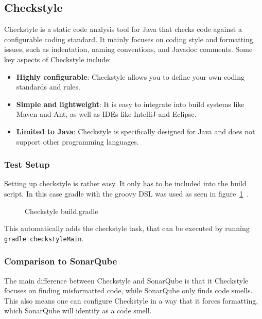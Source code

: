 \subsection{Checkstyle}\label{subsec:checkstyle}
Checkstyle is a static code analysis tool for Java that checks code against a configurable coding standard.
It mainly focuses on coding style and formatting issues, such as indentation, naming conventions, and Javadoc comments.\cite{checkstyle-docs}
Some key aspects of Checkstyle include:

\begin{itemize}
    \item\textbf{Highly configurable}: Checkstyle allows you to define your own coding standards and rules.
    \item\textbf{Simple and lightweight}: It is easy to integrate into build systems like Maven and Ant, as well as IDEs like IntelliJ and Eclipse.
    \item\textbf{Limited to Java}: Checkstyle is specifically designed for Java and does not support other programming languages.
\end{itemize}

\subsubsection{Test Setup}
Setting up checkstyle is rather easy.
It only has to be included into the build script.
In this case gradle with the groovy DSL was used as seen in figure\ \ref{fig:checkstyle-gradle}~\cite{gradle-checkstyle}.

\begin{figure}[h]
    \caption{Checkstyle build.gradle}
    
    \label{fig:checkstyle-gradle}
\end{figure}

This automatically adds the checkstyle task, that can be executed by running \texttt{gradle checkstyleMain}.

\subsubsection{Comparison to SonarQube}
The main difference between Checkstyle and SonarQube is that it Checkstyle focuses on finding misformatted code, while SonarQube only finds code smells.
This also means one can configure Checkstyle in a way that it forces formatting, which SonarQube will identify as a code smell.

